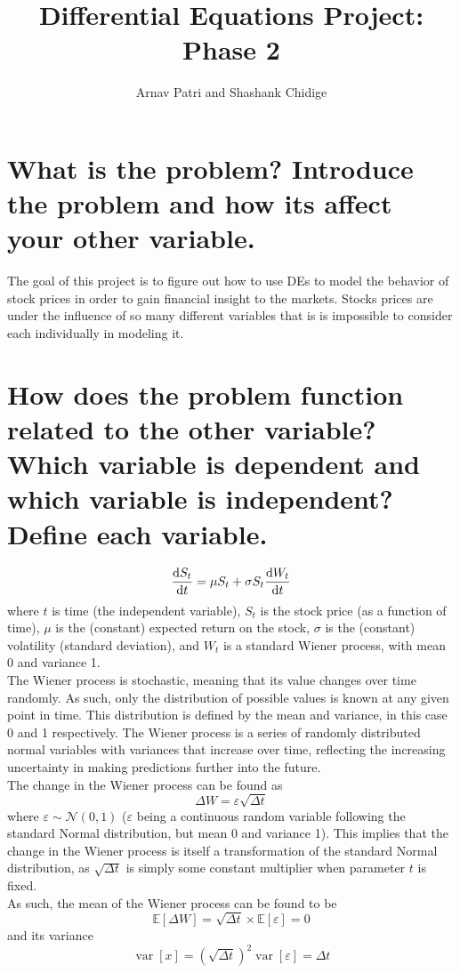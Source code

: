 \documentclass[12pt, A4]{article}
\title{Differential Equations Project: Phase 2}
\author{Arnav Patri and Shashank Chidige}
\newcommand{\Exp}{\mathbb{E}}
\newcommand{\ndist}{\mathcal{N}}
\DeclareMathOperator{\vari}{var}
\begin{document}
	\maketitle
		\section{What is the problem? Introduce the problem and how its affect your other variable.}
			The goal of this project is to figure out how to use DEs to model the behavior of stock prices in order to gain financial insight to the markets. Stocks prices are under the influence of so many different variables that is is impossible to consider each individually in modeling it. 
		\section{How does the problem function related to the other variable? Which variable is dependent and which variable is independent? Define each variable.}
			\[\dv{S_t}{t} = \mu S_t + \sigma S_t\dv{W_t}{t}\]
				where \(t\) is time (the independent variable), \(S_t\) is the stock price (as a function of time), \(\mu\) is the (constant) expected return on the stock, \(\sigma\) is the (constant) volatility (standard deviation), and \(W_t\) is a standard Wiener process, with mean 0 and variance 1. \\
			The Wiener process is stochastic, meaning that its value changes over time randomly. As such, only the distribution of possible values is known at any given point in time. This distribution is defined by the mean and variance, in this case 0 and 1 respectively. The Wiener process is a series of randomly distributed normal variables with variances that increase over time, reflecting the increasing uncertainty in making predictions further into the future. \\
			The change in the Wiener process can be found as
				\[\Delta W = \varepsilon\sqrt{\Delta t}\]
				where \(\varepsilon \sim \ndist(0, 1)\) (\(\varepsilon\) being a continuous random variable following the standard Normal distribution, but mean 0 and variance 1). This implies that the change in the Wiener process is itself a transformation of the standard Normal distribution, as \(\sqrt{\Delta t}\) is simply some constant multiplier when parameter \(t\) is fixed. \\
				As such, the mean of the Wiener process can be found to be
					\[\Exp[\Delta W] = \sqrt{\Delta t} \times \Exp[\varepsilon] = 0\]
				and its variance
					\[\vari[x] = \left(\sqrt{\Delta t}\right)^2\vari[\varepsilon] = \Delta t\]
\end{document}
